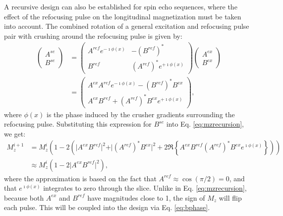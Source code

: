 \documentclass[11pt]{article}
\begin{document}
\par A recursive design can also be established for spin echo sequences, 
where the effect of the refocusing pulse on the longitudinal magnetization must be taken into account.
The combined rotation of a general excitation and refocusing pulse pair with crushing around the refocusing pulse is given by:
\begin{align}
\left(\begin{array}{c} A^{se} \\ B^{se} \end{array}\right) &= \left(\begin{array}{cc} A^{ref}e^{-\imath \phi(x)} & -(B^{ref})^* \\ B^{ref} & (A^{ref})^*e^{+\imath \phi(x)} \end{array}\right) \left(\begin{array}{cc} A^{ex} \\ B^{ex} \end{array}\right) \\
&= \left(\begin{array}{c} A^{ex}A^{ref}e^{-\imath \phi(x)} - (B^{ref})^*B^{ex} \\ A^{ex}B^{ref} + (A^{ref})^* B^{ex} e^{+\imath \phi(x)} \end{array}\right),
\end{align}
where $\phi(x)$ is the phase induced by the crusher gradients surrounding the refocusing pulse. 
Substituting this expression for $B^{se}$ into Eq. \ref{eq:mzrecursion}, we get:
\begin{align}
M_z^{i+1} &= M_z^i \left( 1 - 2 \left( \vert A^{ex} B^{ref} \vert^2 + \vert (A^{ref})^* B^{ex} \vert^2 + 2\Re \left\{ A^{ex} B^{ref} (A^{ref})^* B^{ex} e^{\imath \phi(x)} \right\} \right) \right) \\
&\approx M_z^i \left(1 - 2\vert A^{ex} B^{ref} \vert^2\right),
\end{align}
where the approximation is based on the fact that $A^{ref} \approx \cos\left(\pi/2\right) = 0$, 
and that $e^{\imath \phi(x)}$ integrates to zero through the slice. 
Unlike in Eq. \ref{eq:mzrecursion},
because both $A^{ex}$ and $B^{ref}$ have magnitudes close to 1, 
the sign of $M_z$ will flip each pulse. 
This will be coupled into the design via Eq. \ref{eq:bphase}.
\end{document}
